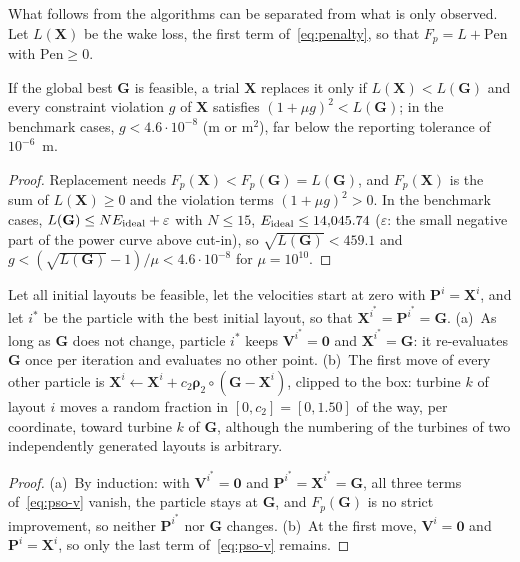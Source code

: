 What follows from the algorithms can be separated from what is only observed. Let $L(\mathbf X)$ be the wake loss, the first term of~\eqref{eq:penalty}, so that $F_p=L+\mathrm{Pen}$ with $\mathrm{Pen}\ge0$.
\begin{lemma}
\label{lem:feas-improve}
If the global best $\mathbf G$ is feasible, a trial $\mathbf X$ replaces it only if $L(\mathbf X)<L(\mathbf G)$ and every constraint violation $g$ of $\mathbf X$ satisfies $(1+\mu g)^2<L(\mathbf G)$; in the benchmark cases, $g<4.6\cdot10^{-8}$ (m or m$^2$), far below the reporting tolerance of $10^{-6}$~m.
\end{lemma}
\begin{proof}
Replacement needs $F_p(\mathbf X)<F_p(\mathbf G)=L(\mathbf G)$, and $F_p(\mathbf X)$ is the sum of $L(\mathbf X)\ge0$ and the violation terms $(1+\mu g)^2>0$. In the benchmark cases, $L(\mathbf G)\le NE_{\rm ideal}+\varepsilon$ with $N\le15$, $E_{\rm ideal}\le14{,}045.74$ ($\varepsilon$: the small negative part of the power curve above cut-in), so $\sqrt{L(\mathbf G)}<459.1$ and $g<(\sqrt{L(\mathbf G)}-1)/\mu<4.6\cdot10^{-8}$ for $\mu=10^{10}$.
\end{proof}
\begin{proposition}
\label{prop:feasible-start}
Let all initial layouts be feasible, let the velocities start at zero with $\mathbf P^i=\mathbf X^i$, and let $i^*$ be the particle with the best initial layout, so that $\mathbf X^{i^*}=\mathbf P^{i^*}=\mathbf G$.
(a)~As long as $\mathbf G$ does not change, particle $i^*$ keeps $\mathbf V^{i^*}=\mathbf 0$ and $\mathbf X^{i^*}=\mathbf G$: it re-evaluates $\mathbf G$ once per iteration and evaluates no other point.
(b)~The first move of every other particle is $\mathbf X^i\leftarrow\mathbf X^i+c_2\boldsymbol\rho_2\circ(\mathbf G-\mathbf X^i)$, clipped to the box: turbine $k$ of layout $i$ moves a random fraction in $[0,c_2]=[0,1.50]$ of the way, per coordinate, toward turbine $k$ of $\mathbf G$, although the numbering of the turbines of two independently generated layouts is arbitrary.
\end{proposition}
\begin{proof}
(a)~By induction: with $\mathbf V^{i^*}=\mathbf 0$ and $\mathbf P^{i^*}=\mathbf X^{i^*}=\mathbf G$, all three terms of~\eqref{eq:pso-v} vanish, the particle stays at $\mathbf G$, and $F_p(\mathbf G)$ is no strict improvement, so neither $\mathbf P^{i^*}$ nor $\mathbf G$ changes. (b)~At the first move, $\mathbf V^i=\mathbf 0$ and $\mathbf P^i=\mathbf X^i$, so only the last term of~\eqref{eq:pso-v} remains.
\end{proof}
